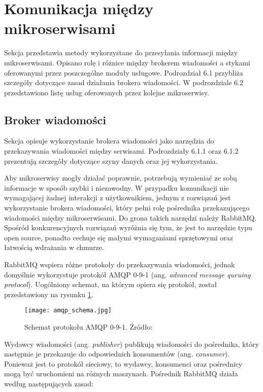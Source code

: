 \newpage
\section{Komunikacja między mikroserwisami}
\label{section:komunikacja-miedzy-serwisami}

Sekcja przedstawia metody wykorzystane do przesyłania informacji między mikroserwisami.
Opisano rolę i różnice między brokerem wiadomości a stykami oferowanymi przez
poszczególne moduły usługowe. Podrozdział 6.1 przybliża szczegóły dotyczące zasad
działania brokera wiadomości. W podrozdziale 6.2 przedstawiono listę usług
oferowanych przez kolejne mikroserwisy.

\subsection{Broker wiadomości}
Sekcja opisuje wykorzystanie brokera wiadomości jako narzędzia do przekazywania
wiadomości między serwisami. Podrozdziały 6.1.1 oraz 6.1.2 prezentują szczegóły dotyczące
szyny danych oraz jej wykorzystania.

Aby mikroserwisy mogły działać poprawnie, potrzebują wymieniać ze sobą informacje 
w sposób szybki i niezawodny. W przypadku komunikacji nie wymagającej żadnej interakcji 
z użytkownikiem, jednym z rozwiązań jest wykorzystanie brokera wiadomości, który pełni 
rolę pośrednika przekazującego wiadomości między mikroserwisami. Do grona takich narzędzi 
należy RabbitMQ. Spośród konkurencyjnych rozwiązań wyróżnia się tym, że jest to 
narzędzie typu open source, ponadto cechuje się małymi wymaganiami sprzętowymi oraz 
łatwością wdrażania w chmurze. 

RabbitMQ wspiera różne protokoły do przekazywania wiadomości, jednak domyślnie 
wykorzystuje protokół AMQP 0-9-1 (ang. \textit{advanced message queuing protocol}). Uogólniony 
schemat, na którym opiera się protokół, został przedstawiony na rysunku \ref{fig:schemat-amqp}.

\begin{figure}[h]
    \centering
    \texttt{[image: amqp\_schema.jpg]}
    \caption{Schemat protokołu AMQP 0-9-1. Źródło: \cite{rabbitmq2022}}
    \label{fig:schemat-amqp}
\end{figure}

Wydawcy wiadomości (ang. \textit{publisher}) publikują wiadomości do pośrednika, który następnie 
je przekazuje do odpowiednich konsumentów (ang. \textit{consumer}). Ponieważ jest to protokół 
sieciowy, to wydawcy, konsumenci oraz pośrednicy mogą być uruchomieni na różnych 
maszynach. Pośrednik RabbitMQ działa według następujących zasad:

